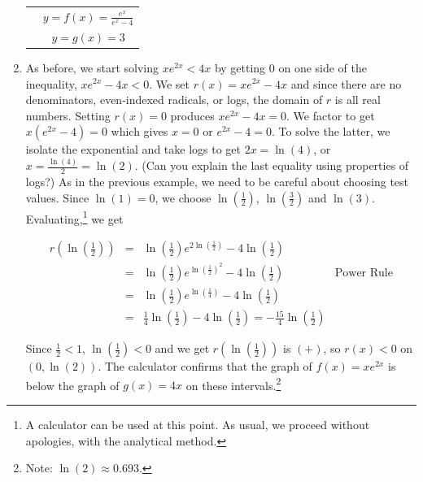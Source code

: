 \begin{ex}
\begin{enumerate}
\begin{center}
\begin{tabular}{m{2in}c}
& $y = f(x) = \frac{e^{x}}{e^{x} - 4}$ \\
& \boldmath $y = g(x) = 3$

\end{tabular}

\end{center}


\item  As before, we start solving $x e^{2x} < 4x$ by getting $0$ on one side of the inequality, $x e^{2x} - 4x < 0$.   We set $r(x) = xe^{2x} - 4x$ and since there are no denominators, even-indexed radicals, or logs, the domain of $r$ is all real numbers.  Setting $r(x) = 0$  produces $x e^{2x} - 4x  = 0$. We factor to get $x \left(e^{2x} - 4\right)  = 0$ which gives $x=0$ or $e^{2x} - 4 = 0$.  To solve the latter, we isolate the exponential and take logs to get $2x = \ln(4)$, or $x = \frac{\ln(4)}{2} = \ln(2)$.  (Can you explain the last equality using properties of logs?)  As in the previous example, we need to be careful about choosing test values.  Since $\ln(1) = 0$, we choose $\ln\left(\frac{1}{2}\right)$, $\ln\left(\frac{3}{2}\right)$ and $\ln(3)$.  Evaluating,\footnote{A calculator can be used at this point. As usual, we proceed without apologies, with the analytical method.} we get 

\[\begin{array}{rclr}

r\left(\ln\left(\frac{1}{2}\right)\right) & = & \ln\left(\frac{1}{2}\right) e^{2\ln\left(\frac{1}{2}\right)} - 4\ln\left(\frac{1}{2}\right) & \\

&= & \ln\left(\frac{1}{2}\right)e^{\ln\left(\frac{1}{2}\right)^2}- 4\ln\left(\frac{1}{2}\right) & \text{Power Rule} \\

& = & \ln\left(\frac{1}{2}\right)e^{\ln\left(\frac{1}{4}\right)}- 4\ln\left(\frac{1}{2}\right) & \\

& = & \frac{1}{4}  \ln\left(\frac{1}{2}\right) - 4  \ln\left(\frac{1}{2}\right) =  -\frac{15}{4} \ln\left(\frac{1}{2}\right) & \end{array}\] 

Since $\frac{1}{2} < 1$, $ \ln\left(\frac{1}{2}\right) < 0$ and we get $r(\ln\left(\frac{1}{2}\right))$ is $(+)$, so $r(x) < 0$ on $(0 ,\ln(2))$.  The calculator confirms that the graph of $f(x) = x e^{2x} $ is below the graph of $g(x) = 4x$ on these intervals.\footnote{Note: $\ln(2) \approx 0.693$.}
\enlargethispage{.5in}


\end{enumerate}
\end{ex}
